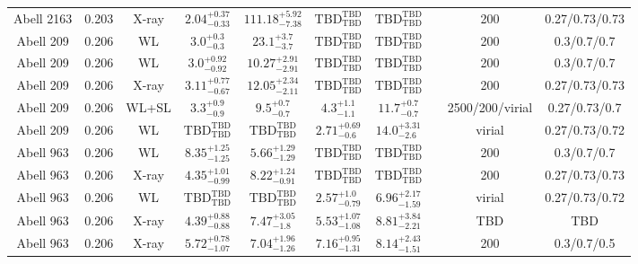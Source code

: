 \begin{table}
\begin{tabular}{cccccccccc}
Abell 2163 & 0.203 & X-ray & ${2.04}^{+0.37}_{-0.33}$ & ${111.18}^{+5.92}_{-7.38}$ & ${\mathrm{TBD}}^{\mathrm{TBD}}_{\mathrm{TBD}}$ & ${\mathrm{TBD}}^{\mathrm{TBD}}_{\mathrm{TBD}}$ & \citet{BA14.1} & 200 & 0.27/0.73/0.73 \\
Abell 209 & 0.206 & WL & ${3.0}^{+0.3}_{-0.3}$ & ${23.1}^{+3.7}_{-3.7}$ & ${\mathrm{TBD}}^{\mathrm{TBD}}_{\mathrm{TBD}}$ & ${\mathrm{TBD}}^{\mathrm{TBD}}_{\mathrm{TBD}}$ & \citet{SE14.1} & 200 & 0.3/0.7/0.7 \\
Abell 209 & 0.206 & WL & ${3.0}^{+0.92}_{-0.92}$ & ${10.27}^{+2.91}_{-2.91}$ & ${\mathrm{TBD}}^{\mathrm{TBD}}_{\mathrm{TBD}}$ & ${\mathrm{TBD}}^{\mathrm{TBD}}_{\mathrm{TBD}}$ & \citet{BA07.1} & 200 & 0.3/0.7/0.7 \\
Abell 209 & 0.206 & X-ray & ${3.11}^{+0.77}_{-0.67}$ & ${12.05}^{+2.34}_{-2.11}$ & ${\mathrm{TBD}}^{\mathrm{TBD}}_{\mathrm{TBD}}$ & ${\mathrm{TBD}}^{\mathrm{TBD}}_{\mathrm{TBD}}$ & \citet{BA14.1} & 200 & 0.27/0.73/0.73 \\
Abell 209 & 0.206 & WL+SL & ${3.3}^{+0.9}_{-0.9}$ & ${9.5}^{+0.7}_{-0.7}$ & ${4.3}^{+1.1}_{-1.1}$ & ${11.7}^{+0.7}_{-0.7}$ & \citet{ME14.1} & 2500/200/virial & 0.27/0.73/0.7 \\
Abell 209 & 0.206 & WL & ${\mathrm{TBD}}^{\mathrm{TBD}}_{\mathrm{TBD}}$ & ${\mathrm{TBD}}^{\mathrm{TBD}}_{\mathrm{TBD}}$ & ${2.71}^{+0.69}_{-0.6}$ & ${14.0}^{+3.31}_{-2.6}$ & \citet{OK10.1} & virial & 0.27/0.73/0.72 \\
Abell 963 & 0.206 & WL & ${8.35}^{+1.25}_{-1.25}$ & ${5.66}^{+1.29}_{-1.29}$ & ${\mathrm{TBD}}^{\mathrm{TBD}}_{\mathrm{TBD}}$ & ${\mathrm{TBD}}^{\mathrm{TBD}}_{\mathrm{TBD}}$ & \citet{BA07.1} & 200 & 0.3/0.7/0.7 \\
Abell 963 & 0.206 & X-ray & ${4.35}^{+1.01}_{-0.99}$ & ${8.22}^{+1.24}_{-0.91}$ & ${\mathrm{TBD}}^{\mathrm{TBD}}_{\mathrm{TBD}}$ & ${\mathrm{TBD}}^{\mathrm{TBD}}_{\mathrm{TBD}}$ & \citet{BA14.1} & 200 & 0.27/0.73/0.73 \\
Abell 963 & 0.206 & WL & ${\mathrm{TBD}}^{\mathrm{TBD}}_{\mathrm{TBD}}$ & ${\mathrm{TBD}}^{\mathrm{TBD}}_{\mathrm{TBD}}$ & ${2.57}^{+1.0}_{-0.79}$ & ${6.96}^{+2.17}_{-1.59}$ & \citet{OK10.1} & virial & 0.27/0.73/0.72 \\
Abell 963 & 0.206 & X-ray & ${4.39}^{+0.88}_{-0.88}$ & ${7.47}^{+3.05}_{-1.8}$ & ${5.53}^{+1.07}_{-1.08}$ & ${8.81}^{+3.84}_{-2.21}$ & \citet{SC06.1} & TBD & TBD \\
Abell 963 & 0.206 & X-ray & ${5.72}^{+0.78}_{-1.07}$ & ${7.04}^{+1.96}_{-1.26}$ & ${7.16}^{+0.95}_{-1.31}$ & ${8.14}^{+2.43}_{-1.51}$ & \citet{AL03.1} & 200 & 0.3/0.7/0.5 \\

\end{tabular}
\end{table}
